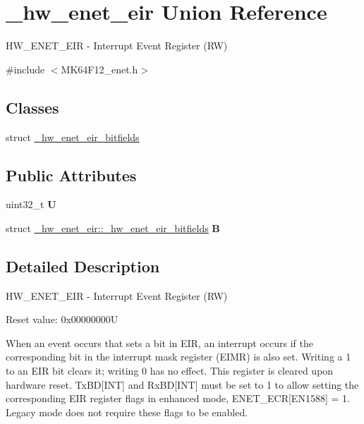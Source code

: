 \hypertarget{union__hw__enet__eir}{}\section{\+\_\+hw\+\_\+enet\+\_\+eir Union Reference}
\label{union__hw__enet__eir}


H\+W\+\_\+\+E\+N\+E\+T\+\_\+\+E\+IR -\/ Interrupt Event Register (RW)  




{\ttfamily \#include $<$M\+K64\+F12\+\_\+enet.\+h$>$}

\subsection*{Classes}
\begin{DoxyCompactItemize}
\item 
struct \hyperlink{struct__hw__enet__eir_1_1__hw__enet__eir__bitfields}{\+\_\+hw\+\_\+enet\+\_\+eir\+\_\+bitfields}
\end{DoxyCompactItemize}
\subsection*{Public Attributes}
\begin{DoxyCompactItemize}
\item 
uint32\+\_\+t {\bfseries U}\hypertarget{union__hw__enet__eir_a9df655ef21ff6409b1e4449632abce6f}{}\label{union__hw__enet__eir_a9df655ef21ff6409b1e4449632abce6f}

\item 
struct \hyperlink{struct__hw__enet__eir_1_1__hw__enet__eir__bitfields}{\+\_\+hw\+\_\+enet\+\_\+eir\+::\+\_\+hw\+\_\+enet\+\_\+eir\+\_\+bitfields} {\bfseries B}\hypertarget{union__hw__enet__eir_ae0c2f2e5d6bedc426337869d53b42b80}{}\label{union__hw__enet__eir_ae0c2f2e5d6bedc426337869d53b42b80}

\end{DoxyCompactItemize}


\subsection{Detailed Description}
H\+W\+\_\+\+E\+N\+E\+T\+\_\+\+E\+IR -\/ Interrupt Event Register (RW) 

Reset value\+: 0x00000000U

When an event occurs that sets a bit in E\+IR, an interrupt occurs if the corresponding bit in the interrupt mask register (E\+I\+MR) is also set. Writing a 1 to an E\+IR bit clears it; writing 0 has no effect. This register is cleared upon hardware reset. Tx\+BD\mbox{[}I\+NT\mbox{]} and Rx\+BD\mbox{[}I\+NT\mbox{]} must be set to 1 to allow setting the corresponding E\+IR register flags in enhanced mode, E\+N\+E\+T\+\_\+\+E\+CR\mbox{[}E\+N1588\mbox{]} = 1. Legacy mode does not require these flags to be enabled. 

